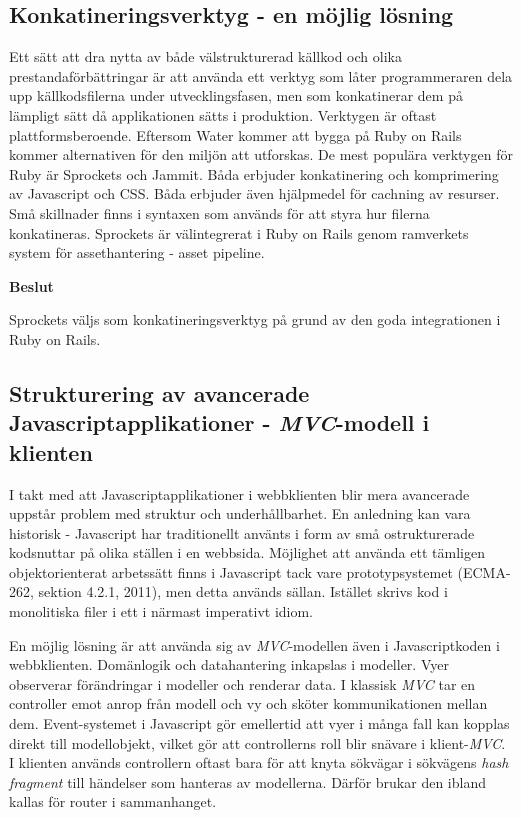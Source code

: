 \subsection{Konkatineringsverktyg - en möjlig lösning}
Ett sätt att dra nytta av både välstrukturerad källkod och olika prestandaförbättringar är att använda ett verktyg som låter programmeraren dela upp källkodsfilerna under utvecklingsfasen, men som konkatinerar dem på lämpligt sätt då applikationen sätts i produktion. 
Verktygen är oftast plattformsberoende. Eftersom Water kommer att bygga på Ruby on Rails kommer alternativen för den miljön att utforskas. 
De mest populära verktygen för Ruby är Sprockets och Jammit. Båda erbjuder konkatinering och komprimering av Javascript och CSS. Båda erbjuder även hjälpmedel för cachning av resurser. Små skillnader finns i syntaxen som används för att styra hur filerna konkatineras.
Sprockets är välintegrerat i Ruby on Rails genom ramverkets system för assethantering - asset pipeline.

\begin{flushright}
  
  \textbf{Beslut}
  
  Sprockets väljs som konkatineringsverktyg på grund av den goda integrationen i Ruby on Rails.
  
\end{flushright}

\subsection{Strukturering av avancerade Javascriptapplikationer - \emph{MVC}-modell i klienten}
I takt med att Javascriptapplikationer i webbklienten blir mera avancerade uppstår problem med struktur och underhållbarhet. En anledning kan vara historisk - Javascript har traditionellt använts i form av små ostrukturerade kodsnuttar på olika ställen i en webbsida. Möjlighet att använda ett tämligen objektorienterat arbetssätt finns i Javascript tack vare prototypsystemet (ECMA-262, sektion 4.2.1, 2011), men detta används sällan. Istället skrivs kod i monolitiska filer i ett i närmast imperativt idiom.

En möjlig lösning är att använda sig av \emph{MVC}-modellen även i Javascriptkoden i webbklienten. Domänlogik och datahantering inkapslas i modeller. Vyer observerar förändringar i modeller och renderar data. I klassisk \emph{MVC} tar en controller emot anrop från modell och vy och sköter kommunikationen mellan dem. Event-systemet i Javascript gör emellertid att vyer i många fall kan kopplas direkt till modellobjekt, vilket gör att controllerns roll blir snävare i klient-\emph{MVC}. I klienten används controllern oftast bara för att knyta sökvägar i sökvägens \emph{hash fragment} till händelser som hanteras av modellerna. Därför brukar den ibland kallas för router i sammanhanget.

